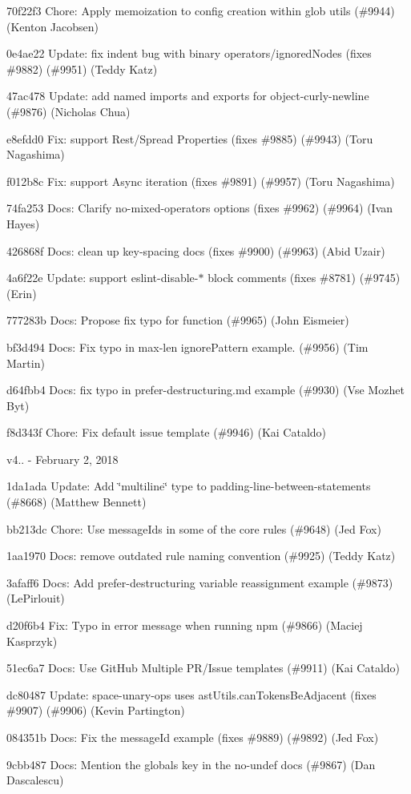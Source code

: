 \begin{DoxyItemize}
\item 70f22f3 Chore\+: Apply memoization to config creation within glob utils (\#9944) (Kenton Jacobsen)
\item 0e4ae22 Update\+: fix indent bug with binary operators/ignored\+Nodes (fixes \#9882) (\#9951) (Teddy Katz)
\item 47ac478 Update\+: add named imports and exports for object-\/curly-\/newline (\#9876) (Nicholas Chua)
\item e8efdd0 Fix\+: support Rest/\+Spread Properties (fixes \#9885) (\#9943) (Toru Nagashima)
\item f012b8c Fix\+: support Async iteration (fixes \#9891) (\#9957) (Toru Nagashima)
\item 74fa253 Docs\+: Clarify no-\/mixed-\/operators options (fixes \#9962) (\#9964) (Ivan Hayes)
\item 426868f Docs\+: clean up key-\/spacing docs (fixes \#9900) (\#9963) (Abid Uzair)
\item 4a6f22e Update\+: support eslint-\/disable-\/$\ast$ block comments (fixes \#8781) (\#9745) (Erin)
\item 777283b Docs\+: Propose fix typo for function (\#9965) (John Eismeier)
\item bf3d494 Docs\+: Fix typo in max-\/len ignore\+Pattern example. (\#9956) (Tim Martin)
\item d64fbb4 Docs\+: fix typo in prefer-\/destructuring.\+md example (\#9930) (Vse Mozhet Byt)
\item f8d343f Chore\+: Fix default issue template (\#9946) (Kai Cataldo)
\end{DoxyItemize}

v4.. -\/ February 2, 2018


\begin{DoxyItemize}
\item 1da1ada Update\+: Add \char`\"{}multiline\char`\"{} type to padding-\/line-\/between-\/statements (\#8668) (Matthew Bennett)
\item bb213dc Chore\+: Use message\+Ids in some of the core rules (\#9648) (Jed Fox)
\item 1aa1970 Docs\+: remove outdated rule naming convention (\#9925) (Teddy Katz)
\item 3afaff6 Docs\+: Add prefer-\/destructuring variable reassignment example (\#9873) (Le\+Pirlouit)
\item d20f6b4 Fix\+: Typo in error message when running npm (\#9866) (Maciej Kasprzyk)
\item 51ec6a7 Docs\+: Use Git\+Hub Multiple P\+R/\+Issue templates (\#9911) (Kai Cataldo)
\item dc80487 Update\+: space-\/unary-\/ops uses ast\+Utils.\+can\+Tokens\+Be\+Adjacent (fixes \#9907) (\#9906) (Kevin Partington)
\item 084351b Docs\+: Fix the message\+Id example (fixes \#9889) (\#9892) (Jed Fox)
\item 9cbb487 Docs\+: Mention the {\ttfamily globals} key in the no-\/undef docs (\#9867) (Dan Dascalescu)
\end{DoxyItemize}

